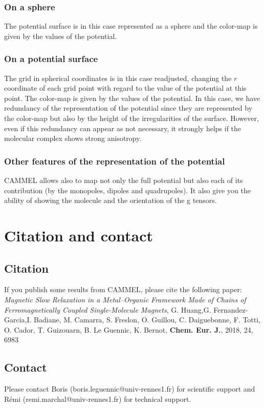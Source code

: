 \documentclass[12pt,a4paper]{article}
\begin{document}
\subsubsection{On a sphere}
The potential surface is in this case represented as a sphere and the color-map is given by the values of the potential.
\subsubsection{On a \og potential surface \fg{}}
The grid in spherical coordinates is in this case readjusted, changing the $r$  coordinate of each grid point with regard to the value of the potential at this point. The color-map is given by the values of the potential. In this case, we have redundancy of the representation of the potential since they are represented by the color-map but also by the height of the irregularities of the surface. However, even if this redundancy can appear as not necessary, it strongly helps if the molecular complex shows strong anisotropy.
\subsubsection{Other features of the representation of the potential}
CAMMEL allows also to map not only the full potential but also each of its contribution (by the monopoles, dipoles and quadrupoles). It also give you the ability of showing the molecule and the orientation of the g tensors.
\section{Citation and contact}
\subsection{Citation}
If you publish some results from CAMMEL, please cite the following paper:\\

\textit{Magnetic Slow Relaxation in a Metal–Organic Framework Made of Chains of Ferromagnetically Coupled Single-Molecule Magnets}, G. Huang,G. Fernandez-Garcia,I. Badiane, M. Camarra, S. Freslon, O. Guillou, C. Daiguebonne, F. Totti, O. Cador, T. Guizouarn, B. Le Guennic, K. Bernot, \textbf{Chem. Eur. J.}, 2018, 24, 6983


\subsection{Contact}
Please contact Boris (boris.leguennic@univ-rennes1.fr) for scientific support and Rémi (remi.marchal@univ-rennes1.fr) for technical support.
\end{document}
